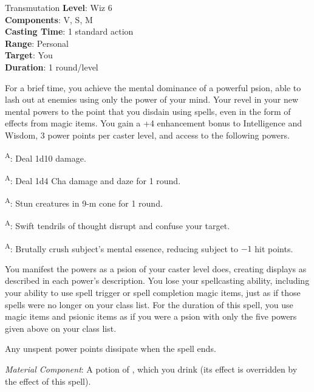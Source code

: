 {Transmutation}
{
	\textbf{Level}: Wiz 6\\
	\textbf{Components}: V, S, M\\
	\textbf{Casting Time}: 1 standard action\\
	\textbf{Range}: Personal\\
	\textbf{Target}: You\\
	\textbf{Duration}: 1 round/level\\
}
{
	For a brief time, you achieve the mental dominance of a powerful psion, able to lash out at enemies using only the power of your mind. Your revel in your new mental powers to the point that you disdain using spells, even in the form of effects from magic items. You gain a +4 enhancement bonus to Intelligence and Wisdom, 3 power points per caster level, and access to the following powers.

	\begin{itemize*}
		\item {}\textsuperscript{A}: Deal 1d10 damage.
		\item {}\textsuperscript{A}: Deal 1d4 Cha damage and daze for 1 round.
		\item {}\textsuperscript{A}: Stun creatures in 9-m cone for 1 round.
		\item {}\textsuperscript{A}: Swift tendrils of thought disrupt and confuse your target.
		\item {}\textsuperscript{A}: Brutally crush subject's mental essence, reducing subject to $-1$ hit points.
	\end{itemize*}

	You manifest the powers as a psion of your caster level does, creating displays as described in each power's description. You lose your spellcasting ability, including your ability to use spell trigger or spell completion magic items, just as if those spells were no longer on your class list. For the duration of this spell, you use magic items and psionic items as if you were a psion with only the five powers given above on your class list.

	Any unspent power points dissipate when the spell ends.

	\textit{Material Component}: A potion of , which you drink (its effect is overridden by the effect of this spell).
}